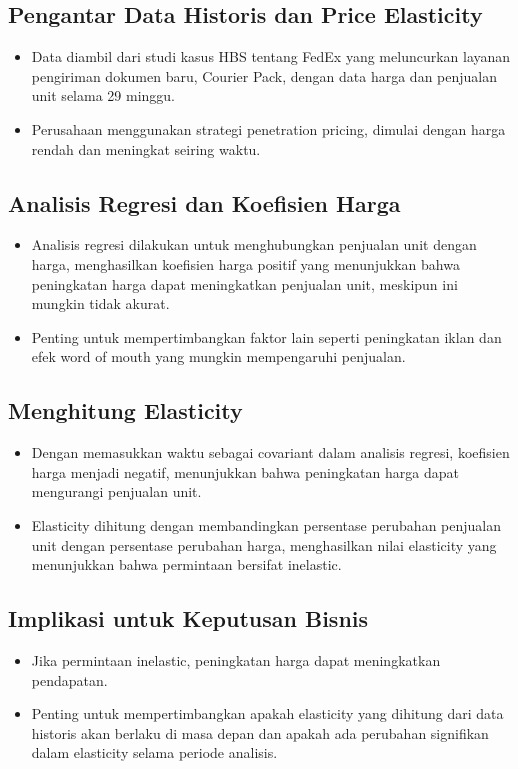 \documentclass{article}
\begin{document}
\subsection{Pengantar Data Historis dan Price Elasticity}
\begin{itemize}
    \item Data diambil dari studi kasus HBS tentang FedEx yang meluncurkan layanan pengiriman dokumen baru, Courier Pack, dengan data harga dan penjualan unit selama 29 minggu.
    \item Perusahaan menggunakan strategi penetration pricing, dimulai dengan harga rendah dan meningkat seiring waktu.
\end{itemize}

\subsection{Analisis Regresi dan Koefisien Harga}
\begin{itemize}
    \item  Analisis regresi dilakukan untuk menghubungkan penjualan unit dengan harga, menghasilkan koefisien harga positif yang menunjukkan bahwa peningkatan harga dapat meningkatkan penjualan unit, meskipun ini mungkin tidak akurat.
    \item Penting untuk mempertimbangkan faktor lain seperti peningkatan iklan dan efek word of mouth yang mungkin mempengaruhi penjualan.
\end{itemize}

\subsection{Menghitung Elasticity}
\begin{itemize}
    \item Dengan memasukkan waktu sebagai covariant dalam analisis regresi, koefisien harga menjadi negatif, menunjukkan bahwa peningkatan harga dapat mengurangi penjualan unit.
    \item Elasticity dihitung dengan membandingkan persentase perubahan penjualan unit dengan persentase perubahan harga, menghasilkan nilai elasticity yang menunjukkan bahwa permintaan bersifat inelastic.
\end{itemize}

\subsection{Implikasi untuk Keputusan Bisnis}
\begin{itemize}
    \item Jika permintaan inelastic, peningkatan harga dapat meningkatkan pendapatan.
    \item Penting untuk mempertimbangkan apakah elasticity yang dihitung dari data historis akan berlaku di masa depan dan apakah ada perubahan signifikan dalam elasticity selama periode analisis.
\end{itemize}
\end{document}
